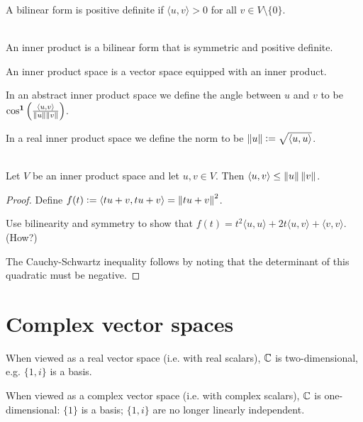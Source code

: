 \begin{definition*}
  A  bilinear form is positive definite if $\langle u, v \rangle > 0$ for all
  $v \in V \setminus \{0\}$. 
\end{definition*}

\begin{definition*}~\\
  An inner product is a bilinear form that is symmetric and positive definite.

  An inner product space is a vector space equipped with an inner product.

  In an abstract inner product space we define the angle between $u$ and $v$ to be
  $\cos^{\mathbf 1}\Big(\frac{\langle u, v \rangle}{\left\Vert u \right\Vert\left\Vert v \right\Vert}\Big)$.

  In a real inner product space we define the norm to be $\left\Vert u \right\Vert := \sqrt{\langle u, u \rangle}$.
\end{definition*}

\begin{theorem*}~\\
  Let $V$ be an inner product space and let $u, v \in V$. Then
  $\langle u, v \rangle \leq \left\Vert u \right\Vert \left\Vert v \right\Vert$.
\end{theorem*}

\begin{proof}
  Define $f(t) := \langle tu + v, tu + v \rangle = \left\Vert tu +v \right\Vert^2$.

  Use bilinearity and symmetry to show that
  $f(t) = t^2 \langle u, u \rangle + 2t \langle u, v \rangle + \langle v, v \rangle$. (How?)

  The Cauchy-Schwartz inequality follows by noting that the determinant of this quadratic must be
  negative.
\end{proof}

\section{Complex vector spaces}
When viewed as a real vector space (i.e. with real scalars), $\mathbb{C}$ is
two-dimensional, e.g. $\{1, i\}$ is a basis.

When viewed as a complex vector space (i.e. with complex scalars), $\mathbb{C}$ is one-dimensional: $\{1\}$
is a basis; $\{1, i\}$ are no longer linearly independent.


